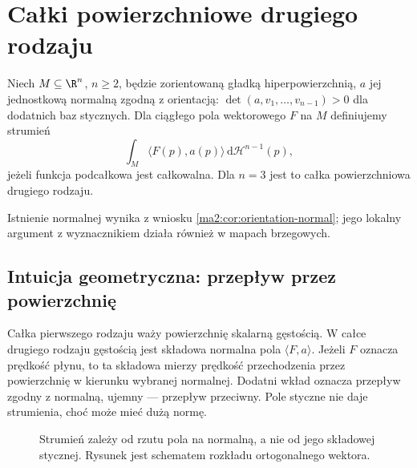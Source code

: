 \section{Całki powierzchniowe drugiego rodzaju}

\begin{definicja}
\label{ma2:def:surface-flux}
Niech $M\subseteq\R^n$, $n\ge2$, będzie
zorientowaną gładką hiperpowierzchnią,
$a$ jej jednostkową normalną zgodną z orientacją:
$\det(a,v_1,\ldots,v_{n-1})>0$ dla dodatnich
baz stycznych. Dla ciągłego pola wektorowego
$F$ na $M$ definiujemy strumień
\[
 \int_M\langle F(p),a(p)\rangle\,
 \mathrm d\mathcal H^{n-1}(p),
\]
jeżeli funkcja podcałkowa jest całkowalna.
Dla $n=3$ jest to całka powierzchniowa drugiego rodzaju.
\end{definicja}
Istnienie normalnej wynika z wniosku
\ref{ma2:cor:orientation-normal}; jego lokalny
argument z wyznacznikiem działa również
w mapach brzegowych.


\subsection{Intuicja geometryczna: przepływ przez powierzchnię}
\label{ma2:sec:flux-intuition}

Całka pierwszego rodzaju waży powierzchnię
skalarną gęstością. W całce drugiego rodzaju
gęstością jest składowa normalna pola
$\langle F,a\rangle$.
Jeżeli $F$ oznacza prędkość płynu, to
ta składowa mierzy prędkość przechodzenia
przez powierzchnię w kierunku wybranej normalnej.
Dodatni wkład oznacza przepływ zgodny z normalną,
ujemny --- przepływ przeciwny. Pole styczne
nie daje strumienia, choć może mieć dużą normę.

\begin{figure}[htbp]
\centering
{}
\caption{Strumień zależy od rzutu pola na normalną,
a nie od jego składowej stycznej. Rysunek jest
schematem rozkładu ortogonalnego wektora.}
\label{ma2:fig:flux-normal}
\end{figure}

